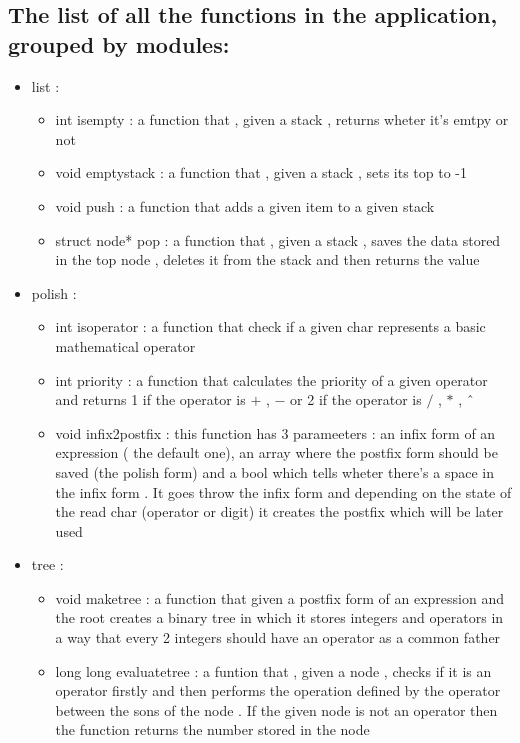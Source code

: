 \documentclass{article}
\begin{document}
\subsection {The list of all the functions in the application, grouped by modules:}
\begin{itemize} 
	\item list :
	\begin{itemize}
		\item int isempty : a function that , given a stack , returns wheter it's emtpy or not
		\item void emptystack : a function that , given a stack , sets its top to -1
		\item void push : a function that adds a given item to a given stack
		\item struct node* pop : a function that , given a stack , saves the data stored in the top node , deletes it from the stack and then returns the value
	\end{itemize}
	\item polish :
	\begin{itemize}
		\item int isoperator : a function that check if a given char represents a basic mathematical operator
		\item int priority : a function that calculates the priority of a given operator and returns 1 if the operator is $+$ , $-$ or 2 if the operator is $/$ , $*$ , \^\ 
		\item void infix2postfix : this function has 3 parameeters : an infix form of an expression ( the default one), an array where the postfix form should be saved (the polish form) and a bool which tells wheter there's a space in the infix form . It goes throw the infix form and depending on the state of the read char (operator or digit) it creates the postfix which will be later used
	\end{itemize}
	\item tree :
	\begin{itemize}
		\item void maketree : a function that given a postfix form of an expression and the root creates a binary tree in which it stores integers and operators in a way that every 2 integers should have an operator as a common father
		\item long long evaluatetree : a funtion that , given a node , checks if it is an operator firstly and then performs the operation defined by the operator between the sons of the node . If the given node is not an operator then the function returns the number stored in the node

\end{itemize}
\end{itemize}
\end{document}
